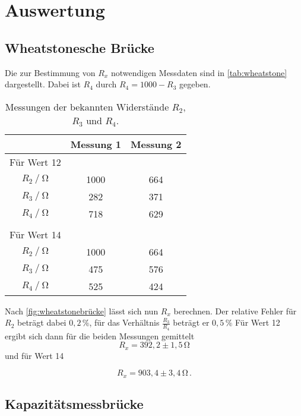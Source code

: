 \section{Auswertung}
\label{sec:Auswertung}

\subsection{Wheatstonesche Brücke}

Die zur Bestimmung von $R_x$ notwendigen Messdaten sind in \autoref{tab:wheatstone} dargestellt.
Dabei ist $R_4$ durch $R_4 = 1000 - R_3$ gegeben.

\begin{table}[H]
  \centering
  \caption{Messungen der bekannten Widerstände $R_2$, $R_3$ und $R_4$.}
  \label{tab:wheatstone}
  \begin{tabular}{S S S}
    \toprule
    & {Messung 1} & {Messung 2} \\
    \midrule
    {Für Wert 12} \\
    {$R_2 \mathbin{/} \unit{\ohm}$} & 1000 & 664 \\
    {$R_3 \mathbin{/} \unit{\ohm}$} &  282 & 371 \\
    {$R_4 \mathbin{/} \unit{\ohm}$} &  718 & 629 \\
    \\
    {Für Wert 14} \\ 
    {$R_2 \mathbin{/} \unit{\ohm}$} & 1000 & 664\\
    {$R_3 \mathbin{/} \unit{\ohm}$} &  475 & 576\\
    {$R_4 \mathbin{/} \unit{\ohm}$} &  525 & 424\\
    \bottomrule
  \end{tabular}
\end{table}

Nach \eqref{fig:wheatstonebrücke} lässt sich nun $R_x$ berechnen. 
Der relative Fehler für $R_2$ beträgt dabei $0,2 \,\%$, für das Verhältnis $\frac{R_3}{R_4}$ beträgt er $0,5 \,\%$
Für Wert 12 ergibt sich dann für die beiden Messungen gemittelt
\begin{equation*}
  R_x =392,2 \pm 1,5 \,\unit{\ohm}
\end{equation*} und für Wert 14

\begin{equation*}
  R_x = 903,4 \pm 3,4 \,\unit{\ohm} \,.
\end{equation*}


\subsection{Kapazitätsmessbrücke}

